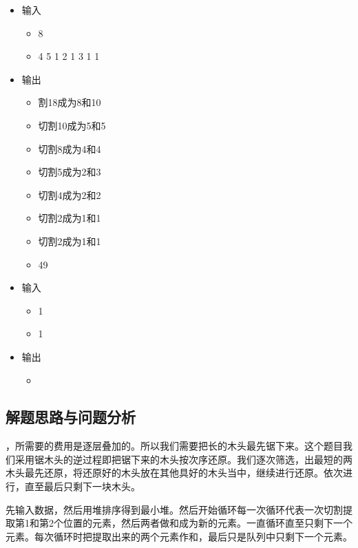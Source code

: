 \documentclass[UTF8]{ctexart}
\begin{document}
\begin{itemize}
    \item 输入
        \begin{itemize}
            \item[ ]8
            \item[ ]4 5 1 2 1 3 1 1
        \end{itemize}
    \item 输出
    \begin{itemize}
        \item[ ] 割18成为8和10
\item[ ]切割10成为5和5
\item[ ]切割8成为4和4
\item[ ]切割5成为2和3
\item[ ]切割4成为2和2
\item[ ]切割2成为1和1
\item[ ]切割2成为1和1
\item[ ]49
    \end{itemize}

        \item 输入
        \begin{itemize}
            \item[ ]1
            \item[ ]1
        \end{itemize}
    \item 输出
    \begin{itemize}
        \item[ ]
    \end{itemize}
\end{itemize}

		\subsection{解题思路与问题分析}
，所需要的费用是逐层叠加的。所以我们需要把长的木头最先锯下来。这个题目我们采用锯木头的逆过程即把锯下来的木头按次序还原。我们逐次筛选，出最短的两木头最先还原，将还原好的木头放在其他具好的木头当中，继续进行还原。依次进行，直至最后只剩下一块木头。\par
先输入数据，然后用堆排序得到最小堆。然后开始循环每一次循环代表一次切割提取第1和第2个位置的元素，然后两者做和成为新的元素。一直循环直至只剩下一个元素。每次循环时把提取出来的两个元素作和，最后只是队列中只剩下一个元素。

	
\end{document}

